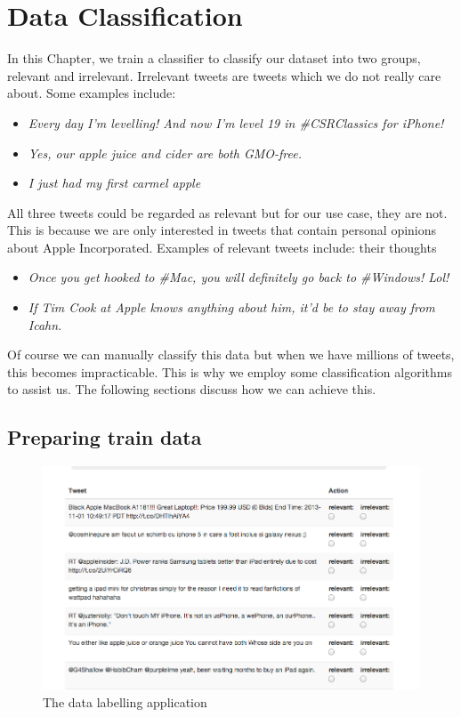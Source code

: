 
\chapter{Data Classification}
\label{cha:data-classification}
In this Chapter, we train a classifier to classify our dataset into two groups, relevant and
irrelevant. Irrelevant tweets are tweets which we do not really care about. Some examples include:

\begin{itemize}
  \item \textit{Every day I'm levelling! And now I'm level 19 in \#CSRClassics for iPhone!}
  \item \textit{Yes, our apple juice and cider are both GMO-free.}
  \item \textit{I just had my first carmel apple}
\end{itemize}

All three tweets could be regarded as relevant but for our use case, they are not. This is because
we are only interested in tweets that contain personal opinions about Apple Incorporated. Examples
of relevant tweets include: their thoughts
\begin{itemize}
  \item \textit{Once you get hooked to \#Mac, you will definitely go back to \#Windows! Lol!}
  \item \textit{If Tim Cook at Apple knows anything about him, it'd be to stay away from Icahn.}
\end{itemize}

Of course we can manually classify this data but when we have millions of tweets, this becomes
impracticable. This is why we employ some classification algorithms to assist us. The following
sections discuss how we can achieve this.

\section{Preparing train data}
\begin{figure}
  \begin{center}
    \includegraphics[scale=0.6]{Figures/datalabeller}
  \end{center}
  \caption{The data labelling application}
\label{fig:labeller}
\end{figure}

